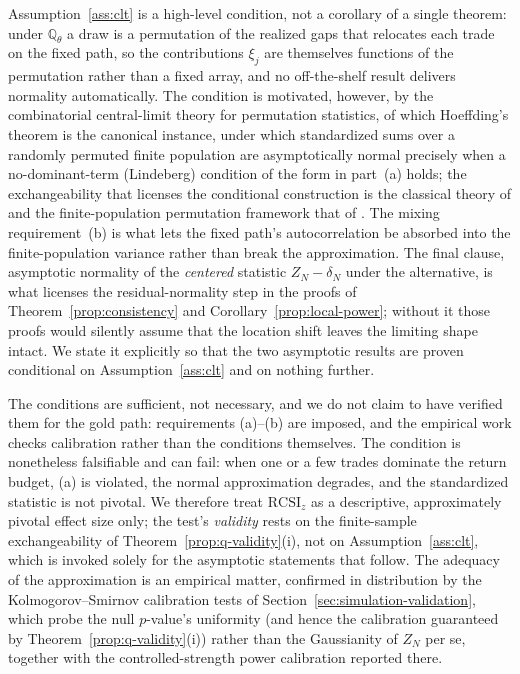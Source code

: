 \documentclass[risks,article,submit,pdftex,oneauthor]{Definitions/mdpi}
\begin{document}
Assumption~\ref{ass:clt} is a high-level condition, not a corollary of a single
theorem: under $\mathbb{Q}_\theta$ a draw is a permutation of the realized gaps
that relocates each trade on the fixed path, so the contributions $\xi_j$ are
themselves functions of the permutation rather than a fixed array, and no
off-the-shelf result delivers normality automatically. The condition is
motivated, however, by the combinatorial central-limit theory for permutation
statistics, of which Hoeffding's theorem \citep{Hoeffding1951} is the canonical
instance, under which standardized sums over a randomly permuted finite
population are asymptotically normal precisely when a no-dominant-term (Lindeberg)
condition of the form in part~(a) holds; the exchangeability that licenses the
conditional construction is the classical theory of \citep{Aldous1985} and the
finite-population permutation framework that of \citep{LehmannRomano2005}. The
mixing requirement~(b) is what lets the fixed path's autocorrelation be absorbed
into the finite-population variance rather than break the approximation. The final
clause, asymptotic normality of the \emph{centered} statistic $Z_N-\delta_N$ under
the alternative, is what licenses the residual-normality step in the proofs of
Theorem~\ref{prop:consistency} and Corollary~\ref{prop:local-power}; without it
those proofs would silently assume that the location shift leaves the limiting
shape intact. We state it explicitly so that the two asymptotic results are
proven conditional on Assumption~\ref{ass:clt} and on nothing further.

The conditions are sufficient, not necessary, and we do not claim to have verified
them for the gold path: requirements (a)--(b) are imposed, and the empirical work
checks calibration rather than the conditions themselves. The condition is
nonetheless falsifiable and can fail: when one or a few trades dominate the return
budget, (a) is violated, the normal approximation degrades, and the standardized
statistic is not pivotal. We therefore treat $\mathrm{RCSI}_z$ as a descriptive,
approximately pivotal effect size only; the test's \emph{validity} rests on the
finite-sample exchangeability of Theorem~\ref{prop:q-validity}(i), not on
Assumption~\ref{ass:clt}, which is invoked solely for the asymptotic statements
that follow. The adequacy of the approximation is an empirical matter, confirmed
in distribution by the Kolmogorov--Smirnov calibration tests of
Section~\ref{sec:simulation-validation}, which probe the null $p$-value's
uniformity (and hence the calibration guaranteed by
Theorem~\ref{prop:q-validity}(i)) rather than the Gaussianity of $Z_N$ per se,
together with the controlled-strength power calibration reported there.
\end{document}
